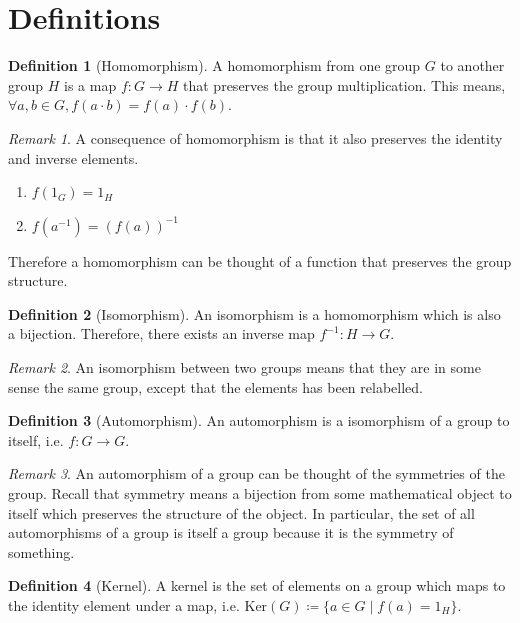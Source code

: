 \documentclass{report}
\theoremstyle{definition}\newtheorem{definition}{Definition}
\theoremstyle{remark}\newtheorem{remark}{Remark}
\theoremstyle{remark}\newtheorem{example}{Example}
\begin{document}
\section{Definitions}
\begin{definition}[Homomorphism]
A homomorphism from one group $G$ to another group $H$ is a map $f:G\to H$ that preserves the group multiplication. This means, $\forall a,b\in G, f(a\cdot b)=f(a)\cdot f(b)$.
\begin{remark}
A consequence of homomorphism is that it also preserves the identity and inverse elements.
\begin{enumerate}
\item $f(1_G)=1_H$
\item $f(a^{-1})=(f(a))^{-1}$
\end{enumerate}
Therefore a homomorphism can be thought of a function that preserves the group structure.
\end{remark}
\end{definition}
\begin{definition}[Isomorphism]
An isomorphism is a homomorphism which is also a bijection. Therefore, there exists an inverse map $f^{-1}:H\to G$.
\end{definition}
\begin{remark}
An isomorphism between two groups means that they are in some sense the same group, except that the elements has been relabelled.
\end{remark}
\begin{definition}[Automorphism]
An automorphism is a isomorphism of a group to itself, i.e. $f:G\to G$.
\end{definition}
\begin{remark}
An automorphism of a group can be thought of the symmetries of the group. Recall that symmetry means a bijection from some mathematical object to itself which preserves the structure of the object. In particular, the set of all automorphisms of a group is itself a group because it is the symmetry of something.
\end{remark}
\begin{definition}[Kernel]
A kernel is the set of elements on a group which maps to the identity element under a map, i.e. $\text{Ker}(G)\coloneqq\{a\in G \mid f(a)=1_H\}$.
\end{definition}
\end{document}
